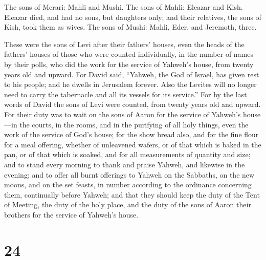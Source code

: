  The sons of Merari: Mahli and Mushi. The sons of Mahli:
Eleazar and Kish.  Eleazar died, and had no sons, but
daughters only; and their relatives, the sons of Kish, took them as
wives.  The sons of Mushi: Mahli, Eder, and Jeremoth,
three.

 These were the sons of Levi after their fathers' houses,
even the heads of the fathers' houses of those who were counted
individually, in the number of names by their polls, who did the work
for the service of Yahweh's house, from twenty years old and upward.
 For David said, ``Yahweh, the God of Israel, has given
rest to his people; and he dwells in Jerusalem forever. 
Also the Levites will no longer need to carry the tabernacle and all its
vessels for its service.''  For by the last words of
David the sons of Levi were counted, from twenty years old and upward.
 For their duty was to wait on the sons of Aaron for the
service of Yahweh's house---in the courts, in the rooms, and in the
purifying of all holy things, even the work of the service of God's
house;  for the show bread also, and for the fine flour
for a meal offering, whether of unleavened wafers, or of that which is
baked in the pan, or of that which is soaked, and for all measurements
of quantity and size;  and to stand every morning to
thank and praise Yahweh, and likewise in the evening; 
and to offer all burnt offerings to Yahweh on the Sabbaths, on the new
moons, and on the set feasts, in number according to the ordinance
concerning them, continually before Yahweh;  and that
they should keep the duty of the Tent of Meeting, the duty of the holy
place, and the duty of the sons of Aaron their brothers for the service
of Yahweh's house.

\hypertarget{section-23}{%
\section{24}\label{section-23}}

